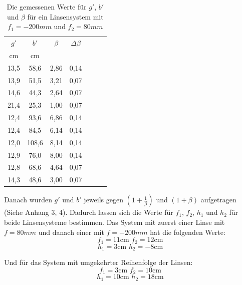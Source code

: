 \documentclass[11pt,a4paper]{article}
\begin{document}
\begin{table}[h]
	\centering
	\begin{tabular*}{0.50\textwidth}{@{\extracolsep{\fill}}cc|ccccc}
		\toprule
		$g'$ & $b'$ & $\beta$ & $\Delta \beta$   \\
		cm & cm& &\\
		13,5&58,6&2,86&0,14\\
		13,9&51,5&3,21&0,07\\
		14,6&44,3&2,64&0,07\\
		21,4&25,3&1,00&0,07\\
		12,4&93,6&6,86&0,14\\
		12,4&84,5&6,14&0,14\\
		12,0&108,6&8,14&0,14\\
		12,9&76,0&8,00&0,14\\
		12,8&68,6&4,64&0,07\\
		14,3&48,6&3,00&0,07\\
		\bottomrule
	\end{tabular*}
	\caption{Die gemessenen Werte für $g'$, $b'$ und $\beta$ für ein Linsensystem mit $f_1 = -200mm$ und $f_2 = 80mm$}
\end{table}

\FloatBarrier
Danach wurden $g'$ und $b'$ jeweils gegen $(1+\frac{1}{\beta})$ und $(1+\beta)$ aufgetragen (Siehe Anhang 3, 4). 
Dadurch lassen sich die Werte für $f_1$, $f_2$, $h_1$ und $h_2$ für beide Linsensysteme bestimmen. 
Das System mit zuerst einer Linse mit $f=80mm$ und danach einer mit $f=-200mm$ hat die folgenden Werte:
$$f_1 = 11\textrm{cm    } f_2 = 12\textrm{cm}$$
$$ h_1 = 3\textrm{cm    } h_2 = -8 \textrm{cm}$$

Und für das System mit umgekehrter Reihenfolge der Linsen:
$$f_1 = 3\textrm{cm    } f_2 = 10 \textrm{cm}$$
$$ h_1 = 10\textrm{cm    } h_2 = 18 \textrm{cm}$$
\end{document}
